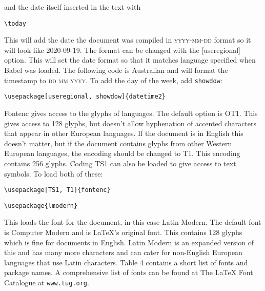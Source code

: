 \documentclass[a4paper]{article}
\begin{document}
and the date itself inserted in the text with 

\begin{verbatim}
\today
\end{verbatim}

This will add the date the document was compiled in \textsc{yyyy-mm-dd} format so it will look like 2020-09-19. The format can be changed with the [useregional] option. This will set the date format so that it matches language specified when Babel was loaded. The following code is Australian and will format the timestamp to \textsc{dd mm yyyy}. To add the day of the week, add \texttt{showdow}:

\begin{verbatim}
\usepackage[useregional, showdow]{datetime2}
\end{verbatim}





Fontenc gives access to the glyphs of languages. The default option is OT1. This gives access to 128 glyphs, but doesn’t allow hyphenation of accented characters that appear in other European languages. If the document is in English this doesn’t matter, but if the document contains glyphs from other Western European languages, the encoding should be changed to T1. This encoding contains 256 glyphs. Coding TS1 can also be loaded to give access to text symbols. To load both of these:

\begin{verbatim}
\usepackage[TS1, T1]{fontenc}
\end{verbatim}



\begin{verbatim}
\usepackage{lmodern}
\end{verbatim}

This loads the font for the document, in this case Latin Modern. The default font is Computer Modern and is LaTeX’s original font. This contains 128 glyphs which is fine for documents in English. Latin Modern is an expanded version of this and has many more characters and can cater for non-English European languages that use Latin characters. Table 4 contains a short list of fonts and package names. A comprehensive list of fonts can be found at The LaTeX Font Catalogue at \texttt{www.tug.org}.
\end{document}
